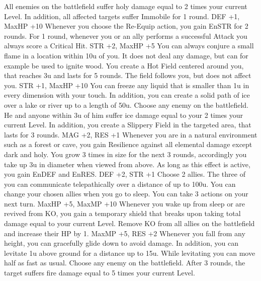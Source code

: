 {All enemies on the battlefield suffer holy damage equal to 2 times your current Level. In addition, all affected targets suffer Immobile for 1 round.}
{DEF +1, MaxHP +10}
%
\vfill
%
{Whenever you choose the Re-Equip action, you gain EnSTR for 2 rounds.}
{For 1 round, whenever you or an ally performs a successful Attack you always score a Critical Hit.}
{STR +2, MaxHP +5}
\vfill
%
{You can always conjure a small flame in a location within 10u of you. It does not deal any damage, but can for example be used to ignite wood.}
{You create a Hot Field centered around you, that reaches 3u and lasts for 5 rounds. The field follows you, but does not affect you.}
{STR +1, MaxHP +10}
%
\clearpage
%
{You can freeze any liquid that is smaller than 1u in every dimension with your touch. In addition, you can create a solid path of ice over a lake or river up to a length of 50u.}
{Choose any enemy on the battlefield. He and anyone within 3u of him suffer ice damage equal to your 2 times your current Level. In addition, you create a Slippery Field in the targeted area, that lasts for 3 rounds.}
{MAG +2, RES +1}
%
\vfill
%
{Whenever you are in a natural environment such as a forest or cave, you gain Resilience against all elemental damage except dark and holy.}
{You grow 3 times in size for the next 3 rounds, accordingly you take up 3u in diameter when viewed from above. As long as this effect is active, you gain EnDEF and EnRES.}
{DEF +2, STR +1}
%
\vfill
%
{Choose 2 allies. The three of you can communicate telepathically over a distance of up to 100u. You can change your chosen allies when you go to sleep.}
{You can take 3 actions on your next turn.}
{MaxHP +5, MaxMP +10}
%
\vfill
%
{Whenever you wake up from sleep or are revived from KO, you gain a temporary shield that breaks upon taking total damage equal to your current Level.}
{Remove KO from all allies on the battlefield and increase their HP by 1.}
{MaxMP +5, RES +2}
%
\vfill
%
{Whenever you fall from any height, you can gracefully glide down to avoid damage. In addition, you can levitate 1u above ground for a distance up to 15u. While levitating you can move half as fast as usual.}
{Choose any enemy on the battlefield. After 3 rounds, the target suffers fire damage equal to 5 times your current Level.}
